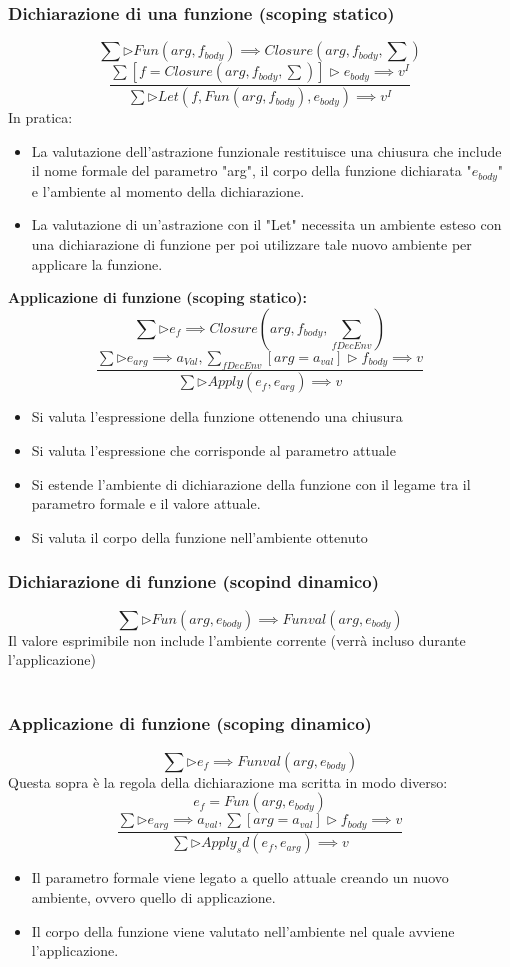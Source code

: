 \documentclass[12pt,a4paper]{article}
\begin{document}
\subsubsection{Dichiarazione di una funzione (scoping statico)}
\[
\sum \triangleright Fun(arg, f_{body}) \implies Closure(arg, f_{body}, \sum)
\]
\[
\frac{\sum[f = Closure(arg,f_{body},\sum)] \triangleright e_{body} \implies v^I}{\sum \triangleright Let(f,Fun(arg,f_{body}), e_{body}) \implies v^I}
\]
In pratica:
\begin{itemize}
  \item La valutazione dell'astrazione funzionale restituisce una chiusura che include il nome formale del parametro "arg", il corpo della funzione dichiarata "$e_{body}$" e l'ambiente al momento della dichiarazione.
  \item La valutazione di un'astrazione con il "Let" necessita un ambiente esteso con una dichiarazione di funzione per poi utilizzare tale nuovo ambiente per applicare la funzione.
\end{itemize}
\textbf{Applicazione di funzione (scoping statico):}
\[
\sum \triangleright e_f \implies Closure(arg,f_{body}, \sum_{fDecEnv})
\]
\[
\frac{\sum \triangleright e_{arg} \implies a_{Val}, \sum_{fDecEnv}[arg = a_{val}] \triangleright f_{body} \implies v}{\sum \triangleright Apply(e_f, e_{arg}) \implies v}
\]
\begin{itemize}
  \item Si valuta l'espressione della funzione ottenendo una chiusura
  \item Si valuta l'espressione che corrisponde al parametro attuale
  \item Si estende l'ambiente di dichiarazione della funzione con il legame tra il parametro formale e il valore attuale.
  \item Si valuta il corpo della funzione nell'ambiente ottenuto
\end{itemize}
\subsubsection{Dichiarazione di funzione (scopind dinamico)}
\[
\sum \triangleright Fun(arg, e_{body}) \implies Funval(arg, e_{body})
\]
Il valore esprimibile non include l'ambiente corrente (verrà incluso durante l'applicazione)\\\\
\subsubsection{Applicazione di funzione (scoping dinamico)}
\[
\sum \triangleright e_f \implies Funval(arg, e_{body})
\]
Questa sopra è la regola della dichiarazione ma scritta in modo diverso:
\[
e_f = Fun(arg, e_{body})
\]
\[
\frac{\sum \triangleright e_{arg} \implies a_{val}, \sum[arg = a_{val}] \triangleright f_{body} \implies v}{\sum \triangleright Apply_sd(e_f, e_{arg}) \implies v}
\]
\begin{itemize}
  \item Il parametro formale viene legato a quello attuale creando un nuovo ambiente, ovvero quello di applicazione.
  \item Il corpo della funzione viene valutato nell'ambiente nel quale avviene l'applicazione.
\end{itemize}
\end{document}
